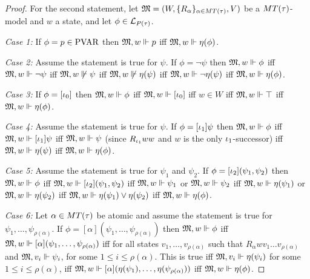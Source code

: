 \begin{proof}
    \par For the second statement, let $\mathfrak{M} = (W,\{ R_{\alpha} \}_{\alpha \in MT(\tau)},V)$ be a $MT(\tau)$-model and $w$ a state, and let $\phi\in \mathcal{L}_{P(\tau)}$.
    \par \textit{Case 1:} If $\phi = p \in\text{PVAR}$ then $\mathfrak{M},w\Vdash p$ iff $\mathfrak{M},w\Vdash \eta(\phi)$.
    \par \textit{Case 2:} Assume the statement is true for $\psi$. If $\phi = \neg\psi$ then $\mathfrak{M},w\Vdash\phi$ iff $\mathfrak{M},w\Vdash \neg\psi$ iff $\mathfrak{M},w\not\Vdash \psi$ iff $\mathfrak{M},w\not\Vdash \eta(\psi)$ iff $\mathfrak{M},w\Vdash \neg\eta(\psi)$ iff $\mathfrak{M},w\Vdash \eta(\phi)$.
    \par \textit{Case 3:} If $\phi = [{\iota_{0}}]$ then $\mathfrak{M},w\Vdash\phi$ iff $\mathfrak{M},w\Vdash[{\iota_{0}}]$ iff $w\in W$ iff $\mathfrak{M},w\Vdash \top$ iff $\mathfrak{M},w\Vdash \eta(\phi)$.
    \par \textit{Case 4:} Assume the statement is true for $\psi$. If $\phi = [{\iota_{1}}]\psi$ then $\mathfrak{M},w\Vdash\phi$ iff $\mathfrak{M},w\Vdash[{\iota_{1}}]\psi$ iff $\mathfrak{M},w\Vdash\psi$ (since $R_{\iota_{1}}ww$ and $w$ is the only ${\iota_{1}}$-successor) iff $\mathfrak{M},w\Vdash\eta(\psi)$ iff $\mathfrak{M},w\Vdash\eta(\phi)$.
    \par \textit{Case 5:} Assume the statement is true for $\psi_1$ and $\psi_2$. If $\phi = [{\iota_{2}}](\psi_1,\psi_2)$ then $\mathfrak{M},w\Vdash\phi$ iff $\mathfrak{M},w\Vdash[{\iota_{2}}](\psi_1,\psi_2)$ iff $\mathfrak{M},w\Vdash\psi_1$ or $\mathfrak{M},w\Vdash\psi_2$ iff $\mathfrak{M},w\Vdash\eta(\psi_1)$ or $\mathfrak{M},w\Vdash\eta(\psi_2)$ iff $\mathfrak{M},w\Vdash\eta(\psi_1) \vee \eta(\psi_2)$ iff $\mathfrak{M},w\Vdash\eta(\phi)$.
    \par \textit{Case 6:} Let $\alpha\in MT(\tau)$ be atomic and assume the statement is true for $\psi_1,\ldots,\psi_{\rho(\alpha)}$. If $\phi = [\alpha](\psi_1,\ldots,\psi_{\rho(\alpha)})$ then $\mathfrak{M},w\Vdash\phi$ iff $\mathfrak{M},w\Vdash[\alpha](\psi_1,\ldots,\psi_{\rho(\alpha)})$ iff for all states $v_1,\ldots,v_{\rho(\alpha)}$ such that $R_\alpha wv_1\ldots v_{\rho(\alpha)}$ and $\mathfrak{M},v_i\Vdash\psi_i$, for some $1\leq i\leq \rho(\alpha)$. This is true iff $\mathfrak{M},v_i\Vdash\eta(\psi_i)$ for some $1\leq i\leq \rho(\alpha)$, iff $\mathfrak{M},w\Vdash[\alpha](\eta(\psi_1),\ldots,\eta(\psi_{\rho(\alpha)}))$ iff $\mathfrak{M},w\Vdash\eta(\phi)$.


\end{proof}
